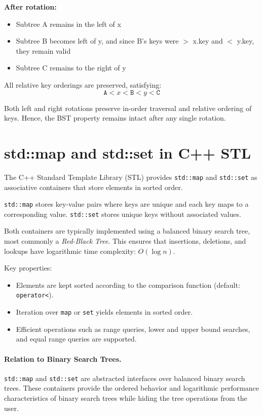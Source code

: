 \documentclass{article}
\begin{document}
\textbf{After rotation:}
\begin{itemize}
  \item Subtree A remains in the left of x
  \item Subtree B becomes left of y, and since B's keys were $>$ x.key and $<$ y.key, they remain valid
  \item Subtree C remains to the right of y
\end{itemize}

All relative key orderings are preserved, satisfying:
\[
\texttt{A} < x < \texttt{B} < y < \texttt{C}
\]


Both left and right rotations preserve in-order traversal and relative ordering of keys. Hence, the BST property remains intact after any single rotation.


\section{std::map and std::set in C++ STL}

The C++ Standard Template Library (STL) provides \verb|std::map| and \verb|std::set| as associative containers that store elements in sorted order.

\verb|std::map| stores key-value pairs where keys are unique and each key maps to a corresponding value.  
\verb|std::set| stores unique keys without associated values.

Both containers are typically implemented using a balanced binary search tree, most commonly a \emph{Red-Black Tree}. This ensures that insertions, deletions, and lookups have logarithmic time complexity: $O(\log n)$.

Key properties:
\begin{itemize}
  \item Elements are kept sorted according to the comparison function (default: \verb|operator<|).
  \item Iteration over \verb|map| or \verb|set| yields elements in sorted order.
  \item Efficient operations such as range queries, lower and upper bound searches, and equal range queries are supported.
\end{itemize}

\paragraph{Relation to Binary Search Trees.}  
\verb|std::map| and \verb|std::set| are abstracted interfaces over balanced binary search trees. These containers provide the ordered behavior and logarithmic performance characteristics of binary search trees while hiding the tree operations from the user.
\end{document}
